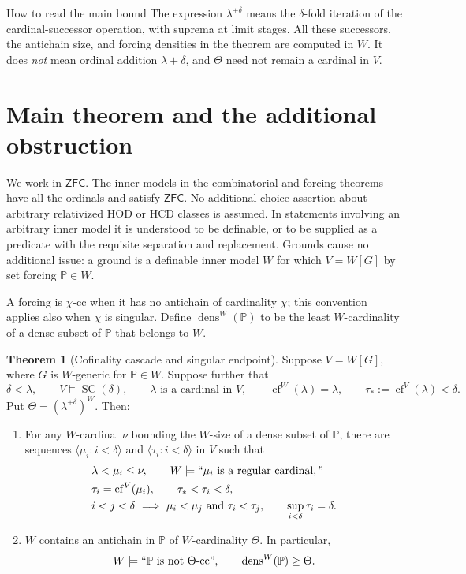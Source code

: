 \documentclass[11pt,letterpaper]{article}
\theoremstyle{definition}
\newtheorem{theorem}[definition]{Theorem}
\numberwithin{equation}{section}
\newcommand{\ZFC}{\mathsf{ZFC}}
\newcommand{\cf}{\operatorname{cf}}
\newcommand{\dens}{\operatorname{dens}}
\newcommand{\SC}{\operatorname{SC}}
\newcommand{\PP}{\mathbb P}
\newcommand{\cc}{\text{-cc}}
\begin{document}
\tableofcontents
\vspace{0.15in}
\begin{assessment}{How to read the main bound}
The expression $\lambda^{+\delta}$ means the $\delta$-fold iteration of the cardinal-successor operation, with suprema at limit stages. All these successors, the antichain size, and forcing densities in the theorem are computed in $W$. It does \emph{not} mean ordinal addition $\lambda+\delta$, and $\Theta$ need not remain a cardinal in $V$.
\end{assessment}
\newpage

\section{Main theorem and the additional obstruction}\label{sec:main}

We work in $\ZFC$. The inner models in the combinatorial and forcing theorems have all the ordinals and satisfy $\ZFC$. No additional choice assertion about arbitrary relativized HOD or HCD classes is assumed. In statements involving an arbitrary inner model it is understood to be definable, or to be supplied as a predicate with the requisite separation and replacement. Grounds cause no additional issue: a ground is a definable inner model $W$ for which $V=W[G]$ by set forcing $\PP\in W$.

A forcing is $\chi\cc$ when it has no antichain of cardinality $\chi$; this convention applies also when $\chi$ is singular. Define $\dens^W(\PP)$ to be the least $W$-cardinality of a dense subset of $\PP$ that belongs to $W$.

\begin{theorem}[Cofinality cascade and singular endpoint]\label{thm:main}
Suppose $V=W[G]$, where $G$ is $W$-generic for $\PP\in W$. Suppose further that
\[
\delta<\lambda,\qquad V\models\SC(\delta),\qquad
\lambda\text{ is a cardinal in }V,\qquad
\cf^W(\lambda)=\lambda,\qquad \tau_*:=\cf^V(\lambda)<\delta.
\]
Put $\Theta=(\lambda^{+\delta})^W$. Then:
\begin{enumerate}
\item For any $W$-cardinal $\nu$ bounding the $W$-size of a dense subset of $\PP$, there are sequences $\langle\mu_i:i<\delta\rangle$ and $\langle\tau_i:i<\delta\rangle$ in $V$ such that
\begin{align*}
&\lambda<\mu_i\le\nu,\qquad W\models ``\mu_i\text{ is a regular cardinal},"\\
&\tau_i=\cf^V(\mu_i),\qquad \tau_*<\tau_i<\delta,\\
&i<j<\delta\ \Longrightarrow\ \mu_i<\mu_j\text{ and }\tau_i<\tau_j,\qquad
\sup_{i<\delta}\tau_i=\delta.
\end{align*}
\item $W$ contains an antichain in $\PP$ of $W$-cardinality $\Theta$. In particular,
\[
W\models ``\PP\text{ is not }\Theta\cc",\qquad
\dens^W(\PP)\ge\Theta.
\]
\end{enumerate}
\end{theorem}
\end{document}
